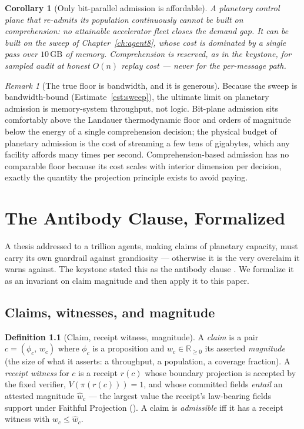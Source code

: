 \documentclass[11pt,oneside]{book}
\theoremstyle{definition}
\newtheorem{definition}{Definition}[chapter]
\theoremstyle{plain}
\newtheorem{corollary}[theorem]{Corollary}
\theoremstyle{remark}
\newtheorem*{remark}{Remark}
\newcommand{\Proj}{\pi}                        %
\begin{document}
\begin{corollary}[Only bit-parallel admission is affordable]\label{cor:onlybit}
A planetary control plane that re-admits its population continuously cannot be built on
comprehension: no attainable accelerator fleet closes the demand gap. It can be built on the
sweep of Chapter~\ref{ch:agent8}, whose cost is dominated by a single pass over $10\,\mathrm{GB}$
of memory. Comprehension is reserved, as in the keystone, for \emph{sampled audit} at honest
$O(n)$ replay cost --- never for the per-message path.
\end{corollary}

\begin{remark}[The true floor is bandwidth, and it is generous]
Because the sweep is bandwidth-bound (Estimate~\ref{est:sweep}), the ultimate limit on planetary
admission is memory-system throughput, not logic. Bit-plane admission sits comfortably above the
Landauer thermodynamic floor and orders of magnitude below the energy of a single comprehension
decision; the physical budget of planetary admission is the cost of streaming a few tens of
gigabytes, which any facility affords many times per second. Comprehension-based admission has no
comparable floor because its cost scales with interior dimension per decision, exactly the
quantity the projection principle exists to avoid paying.
\end{remark}

\chapter{The Antibody Clause, Formalized}
\label{ch:antibody}

A thesis addressed to a trillion agents, making claims of planetary capacity, must carry its own
guardrail against grandiosity --- otherwise it is the very overclaim it warns against. The
keystone stated this as the antibody clause \cite[Prop.~6.4]{keystone}. We formalize it as an
invariant on claim magnitude and then apply it to this paper.

\section{Claims, witnesses, and magnitude}

\begin{definition}[Claim, receipt witness, magnitude]\label{def:claim}
A \emph{claim} is a pair $c=(\phi_c,\,w_c)$ where $\phi_c$ is a proposition and $w_c\in\mathbb R_{\ge 0}$
its asserted \emph{magnitude} (the size of what it asserts: a throughput, a population, a coverage
fraction). A \emph{receipt witness} for $c$ is a receipt $r(c)$ whose boundary projection is
accepted by the fixed verifier, $V(\Proj(r(c)))=1$, and whose committed fields \emph{entail} an
attested magnitude $\widehat w_c$ --- the largest value the receipt's law-bearing fields support
under Faithful Projection (\cite[Thm.~3.2]{keystone}). A claim is \emph{admissible} iff it has a
receipt witness with $w_c\le\widehat w_c$.
\end{definition}
\end{document}
